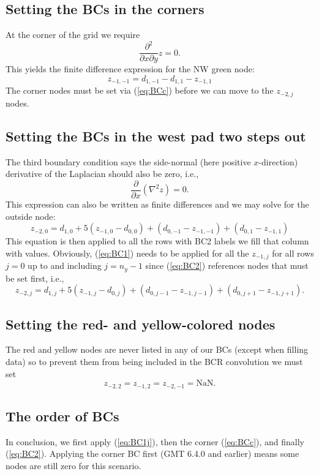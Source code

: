 \documentclass[12pt,letterpaper,margin=0.5in]{article}
\begin{document}
\subsection{Setting the BCs in the corners}
At the corner of the grid we require 
\begin{equation}
	\frac{\partial^2}{\partial x \partial y} z = 0.
\end{equation}
This yields the finite difference expression for the NW green node:
\begin{equation}
	z_{-1,-1} = d_{1,-1} - d_{1,1} - z_{-1,1}
	\label{eq:BCc}
\end{equation}
The corner nodes must be set via (\ref{eq:BCc}) before we can move to the $z_{-2,j}$ nodes.

\subsection{Setting the BCs in the west pad two steps out}
The third boundary condition says the side-normal (here positive $x$-direction) derivative of the Laplacian should also be
zero, i.e.,
\begin{equation}
	\frac{\partial}{\partial x} \left (\nabla^2 z \right ) = 0.
\end{equation}
This expression can also be written as finite differences and we may solve for the outside node:
\begin{equation}
	z_{-2,0} = d_{1,0} + 5(z_{-1,0} - d_{0,0}) + (d_{0,-1} - z_{-1,-1}) + (d_{0,1} - z_{-1,1})
	\label{eq:BC2}
\end{equation}
This equation is then applied to all the rows with BC2 labels we fill that column with values.
Obviously, (\ref{eq:BC1}) needs to be applied for all the $z_{-1,j}$ for all rows $j = 0$ up to
and including $j = n_y - 1$ since (\ref{eq:BC2}) references nodes that must be set first, i.e.,
\begin{equation}
	z_{-2,j} = d_{1,j} + 5(z_{-1,j} - d_{0,j}) + (d_{0,j-1} - z_{-1,j-1}) + (d_{0,j+1} - z_{-1,j+1}).
	\label{eq:BC2}
\end{equation}

\subsection{Setting the red- and yellow-colored nodes}
The red and yellow nodes are never listed in any of our BCs (except when filling data) so to prevent them
from being included in the BCR convolution we must set
\begin{equation}
	z_{-2,2} = z_{-1,2} = z_{-2,-1} = \mbox{NaN}.
	\label{eq:BC2}
\end{equation}

\subsection{The order of BCs}
In conclusion, we first apply (\ref{eq:BC1j}), then the corner (\ref{eq:BCc}), and finally (\ref{eq:BC2}).
Applying the corner BC first (GMT 6.4.0 and earlier) means some nodes are still zero for this scenario.
\end{document}
